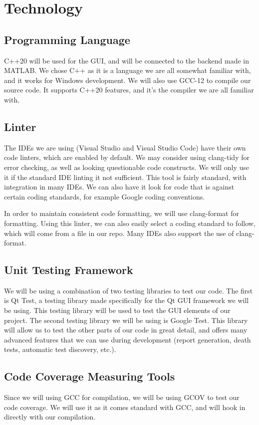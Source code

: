 \documentclass{article}
\begin{document}
\section{Technology}

\subsection{Programming Language}
C++20 will be used for the GUI, and will be connected to the backend made in MATLAB.
We chose C++ as it is a language we are all somewhat familiar with, and it works for
Windows development. We will also use GCC-12 to compile our source code. It supports C++20
features, and it's the compiler we are all familiar with.

\subsection{Linter}
The IDEs we are using (Visual Studio and Visual Studio Code) have their own code linters, which are enabled by default.
We may consider using clang-tidy for error checking, as well as looking questionable code constructs. We will
only use it if the standard IDE linting it not sufficient. This tool is fairly standard, with integration in many 
IDEs. We can also have it look for code that is against certain coding standards, for example Google coding conventions.

In order to maintain consistent code formatting, we will use clang-format for formatting. Using this linter, 
we can also easily select a coding standard to follow, which will come from a file in our repo. Many IDEs
also support the use of clang-format. 

\subsection{Unit Testing Framework}
We will be using a combination of two testing libraries to test our code. The first is Qt Test, a testing library made specifically for the Qt GUI framework we will be using. This testing library will be used to test the GUI elements of our project.
The second testing library we will be using is Google Test. This library will allow us to test the other parts of our code in great detail, and offers many advanced features that we can use during development (report generation, death tests, automatic test discovery, etc.).

\subsection{Code Coverage Measuring Tools}
Since we will using GCC for compilation, we will be using GCOV to test our code coverage. We will use it as
it comes standard with GCC, and will hook in directly with our compilation.
\end{document}
